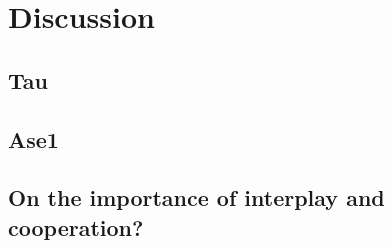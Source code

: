 \chapter{Discussion}
\section{Tau}

\section{Ase1}


\section{On the importance of interplay and cooperation?}